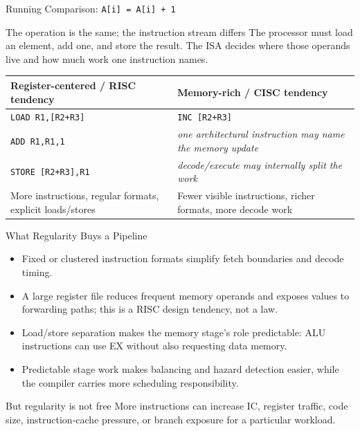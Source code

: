 \documentclass[aspectratio=169]{beamer}
\begin{document}
\begin{frame}{Running Comparison: \texttt{A[i] = A[i] + 1}}
  \small
  \begin{exampleblock}{The operation is the same; the instruction stream differs}
    The processor must load an element, add one, and store the result. The ISA
    decides where those operands live and how much work one instruction names.
  \end{exampleblock}
  \begin{tabular}{@{}p{5.6cm}p{5.6cm}@{}}
    \toprule
    \textbf{Register-centered / RISC tendency} & \textbf{Memory-rich / CISC tendency}\\
    \midrule
    \texttt{LOAD R1,[R2+R3]} & \texttt{INC [R2+R3]}\\
    \texttt{ADD R1,R1,1} & \textit{one architectural instruction may name the memory update}\\
    \texttt{STORE [R2+R3],R1} & \textit{decode/execute may internally split the work}\\
    More instructions, regular formats, explicit loads/stores & Fewer visible instructions, richer formats, more decode work\\
    \bottomrule
  \end{tabular}
  \vspace{0.15cm}
\end{frame}

\begin{frame}{What Regularity Buys a Pipeline}
  \begin{itemize}
    \item Fixed or clustered instruction formats simplify fetch boundaries and
      decode timing.
    \item A large register file reduces frequent memory operands and exposes
      values to forwarding paths; this is a RISC design tendency, not a law.
    \item Load/store separation makes the memory stage's role predictable:
      ALU instructions can use EX without also requesting data memory.
    \item Predictable stage work makes balancing and hazard detection easier,
      while the compiler carries more scheduling responsibility.
  \end{itemize}
  \begin{alertblock}{But regularity is not free}
    More instructions can increase $\mathrm{IC}$, register traffic, code size,
    instruction-cache pressure, or branch exposure for a particular workload.
  \end{alertblock}
\end{frame}
\end{document}
